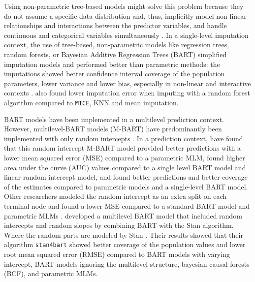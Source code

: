 \documentclass[10pt, a4paper, titlepage]{article}
\begin{document}
Using non-parametric tree-based models might solve this problem because they do not assume a specific data distribution and, thus, implicitly model non-linear relationships and interactions between the predictor variables, and handle continuous and categorical variables simultaneously \citep{hill2020, burgette2010, lin2019, chipman2010, james2021, salditt2023, breiman1984}. In a single-level imputation context, the use of tree-based, non-parametric models like regression trees, random forests, or Bayesian Additive Regression Trees (BART) simplified imputation models and performed better than parametric methods: the imputations showed better confidence interval coverage of the population parameters, lower variance and lower bias, especially in non-linear and interactive contexts \citep{burgette2010, xu2016, silva2022}. \citet{waljee2013} also found lower imputation error when imputing with a random forest algorithm compared to \texttt{MICE}, KNN and mean imputation.

BART models have been implemented in a multilevel prediction context. However, multilevel-BART models (M-BART) have predominantly been implemented with only random intercepts \citep{chen2020, wagner2020, tan2016, wundervald2022}. In a prediction context, \citet{wagner2020} have found that this random intercept M-BART model provided better predictions with a lower mean squared error (MSE) compared to a parametric MLM, \citet{tan2016} found higher area under the curve (AUC) values compared to a single level BART model and linear random intercept model, and \citet{chen2020} found better predictions and better coverage of the estimates compared to parametric models and a single-level BART model. Other researchers modeled the random intercept as an extra split on each terminal node and found a lower MSE compared to a standard BART model and parametric MLMs \citep{wundervald2022}. \citet{dorie2022} developed a multilevel BART model that included random intercepts and random slopes by combining BART with the Stan algorithm. Where the random parts are modeled by Stan \citep{lee2017}. Their results showed that their algorithm \texttt{stan4bart} showed better coverage of the population values and lower root mean squared error (RMSE) compared to BART models with varying intercept, BART models ignoring the multilevel structure, bayesian causal forests (BCF), and parametric MLMs.
\end{document}
